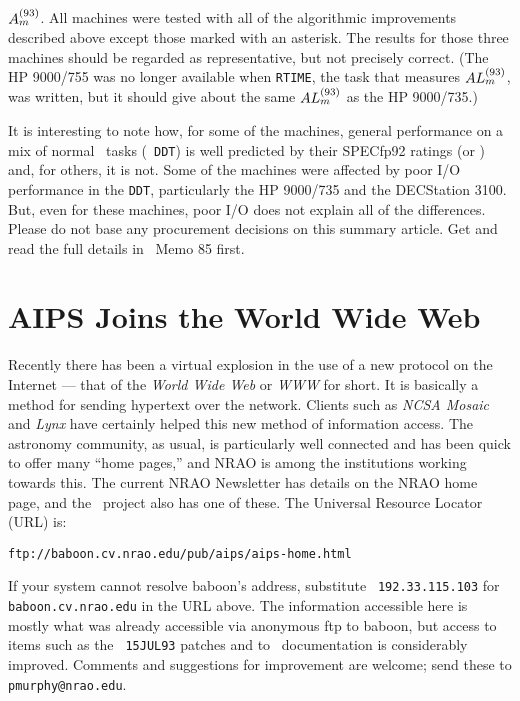 $A_m^{(93)}$.  All machines were tested with all of the algorithmic
improvements described above except those marked with an asterisk.
The results for those three machines should be regarded as
representative, but not precisely correct.  (The HP 9000/755 was no
longer available when {\tt RTIME}, the task that measures $AL_m^{(93)}$, was
written, but it should give about the same $AL_m^{(93)}$ as the HP 9000/735.)

It is interesting to note how, for some of the machines, general
performance on a mix of normal \AIPS\ tasks (\ie\ {\tt DDT}) is well
predicted by their SPECfp92 ratings (or \LMarks) and, for others, it
is not.  Some of the machines were affected by poor I/O performance in
the {\tt DDT}, particularly the HP 9000/735 and the DECStation 3100.
But, even for these machines, poor I/O does not explain all of the
differences.  Please do not base any procurement decisions on this
summary article. Get and read the full details in \AIPS\ Memo 85
first.

\section{AIPS Joins the World Wide Web}

Recently there has been a virtual explosion in the use of a new protocol
on the Internet --- that of the {\it World Wide Web\/} or {\it WWW\/}
for short.  It is basically a method for sending hypertext over the
network.  Clients such as {\it NCSA Mosaic\/} and {\it Lynx\/} have
certainly helped this new method of information access.  The astronomy
community, as usual, is particularly well connected and has been quick
to offer many ``home pages,'' and NRAO is among the institutions
working towards this.  The current NRAO Newsletter has details on the
NRAO home page, and the \AIPS\ project also has one of these.  The
Universal Resource Locator (URL) is:
\begin{center}
\vskip -10pt
{\tt ftp://baboon.cv.nrao.edu/pub/aips/aips-home.html}
\vskip -10pt
\end{center}
If your system cannot resolve baboon's address, substitute {\tt
192.33.115.103} for {\tt baboon.cv.nrao.edu} in the URL above.
The information accessible here is mostly what was already accessible
via anonymous ftp to baboon, but access to items such as the {\tt
15JUL93} patches and to \AIPS\ documentation is considerably improved.
Comments and suggestions for improvement are welcome; send these to {\tt
pmurphy@nrao.edu}.


